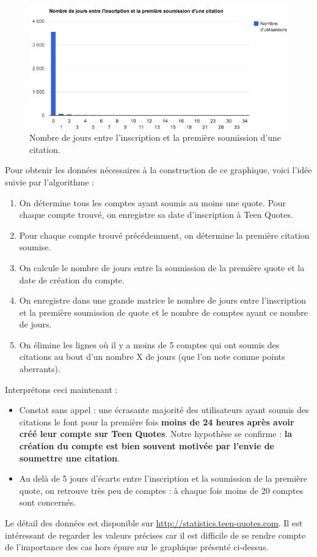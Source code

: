 \documentclass{report}
\begin{document}
	\begin{figure}[H]
		\center
		\includegraphics[width=450px]{images/inscriptionSoumissionQuote.png}
		\caption{Nombre de jours entre l'inscription et la première soumission d'une citation.}
	\end{figure}
	Pour obtenir les données nécessaires à la construction de ce graphique, voici l'idée suivie par l'algorithme :
	\vspace{10px}
	\begin{enumerate}
		\item On détermine tous les comptes ayant soumis au moins une quote. Pour chaque compte trouvé, on enregistre sa date d'inscription à Teen Quotes.
		\item Pour chaque compte trouvé précédemment, on détermine la première citation soumise.
		\item On calcule le nombre de jours entre la soumission de la première quote et la date de création du compte.
		\item On enregistre dans une grande matrice le nombre de jours entre l'inscription et la première soumission de quote et le nombre de comptes ayant ce nombre de jours.
		\item On élimine les lignes où il y a moins de 5 comptes qui ont soumis des citations au bout d'un nombre X de jours (que l'on note comme points aberrants).
	\end{enumerate}
	\vspace{10px}
	Interprétons ceci maintenant :
	\vspace{10px}
	\begin{itemize}
		\item Constat sans appel : une écrasante majorité des utilisateurs ayant soumis des citations le font pour la première fois \textbf{moins de 24 heures après avoir créé leur compte sur Teen Quotes}. Notre hypothèse se confirme : \textbf{la création du compte est bien souvent motivée par l'envie de soumettre une citation}.
		\item Au delà de 5 jours d'écarts entre l'inscription et la soumission de la première quote, on retrouve très peu de comptes : à chaque fois moins de 20 comptes sont concernés.  
	\end{itemize}
	\vspace{10px}
	Le détail des données est disponible sur \url{http://statistics.teen-quotes.com}. Il est intéressant de regarder les valeurs précises car il est difficile de se rendre compte de l'importance des cas hors épure sur le graphique présenté ci-dessus.
\end{document}
